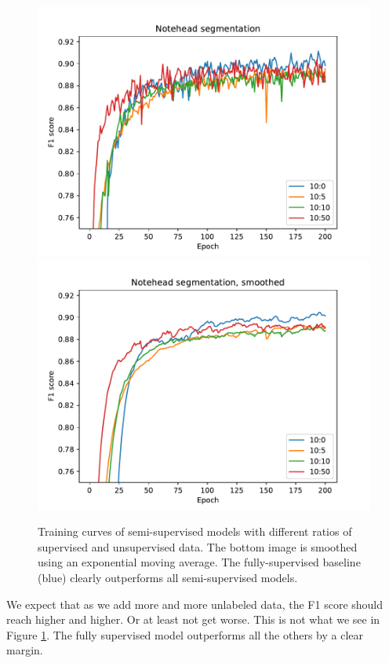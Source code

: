 \begin{figure}[p]
    \centering
    \includegraphics[width=140mm]{../../figures/01-exploration-noteheads/noteheads-dropout.pdf}
    \includegraphics[width=140mm]{../../figures/01-exploration-noteheads/noteheads-dropout-smooth.pdf}
    \caption{Training curves of semi-supervised models with different ratios of supervised and unsupervised data. The bottom image is smoothed using an exponential moving average. The fully-supervised baseline (blue) clearly outperforms all semi-supervised models.}
    \label{fig:ExplorationNoteheads}
\end{figure}

We expect that as we add more and more unlabeled data, the F1 score should reach higher and higher. Or at least not get worse. This is not what we see in Figure \ref{fig:ExplorationNoteheads}. The fully supervised model outperforms all the others by a clear margin.

